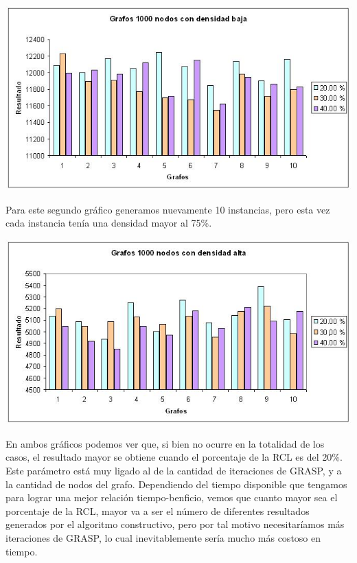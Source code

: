 \documentclass[a4paper, 10pt]{article}
\begin{document}
\begin{center}
	\includegraphics[scale=0.60]{Graficos/06-02.jpg}
\end{center}

\newpage

Para este segundo gr\'afico generamos nuevamente 10 instancias, pero esta vez cada instancia ten\'ia una densidad mayor al 75\%. \\

\begin{center}
	\includegraphics[scale=0.60]{Graficos/06-03.jpg}
\end{center}

En ambos gr\'aficos podemos ver que, si bien no ocurre en la totalidad de los casos, el resultado mayor se obtiene cuando el porcentaje de la RCL es del 20\%. \\ 

Este par\'ametro est\'a muy ligado al de la cantidad de iteraciones de GRASP, y a la cantidad de nodos del grafo. Dependiendo del tiempo disponible que tengamos para lograr una mejor relaci\'on tiempo-benficio, vemos que cuanto mayor sea el porcentaje de la RCL, mayor va a ser el n\'umero de diferentes resultados generados por el algoritmo constructivo, pero por tal motivo necesitar\'iamos m\'as iteraciones de GRASP, lo cual inevitablemente ser\'ia mucho m\'as costoso en tiempo. \\
\end{document}
